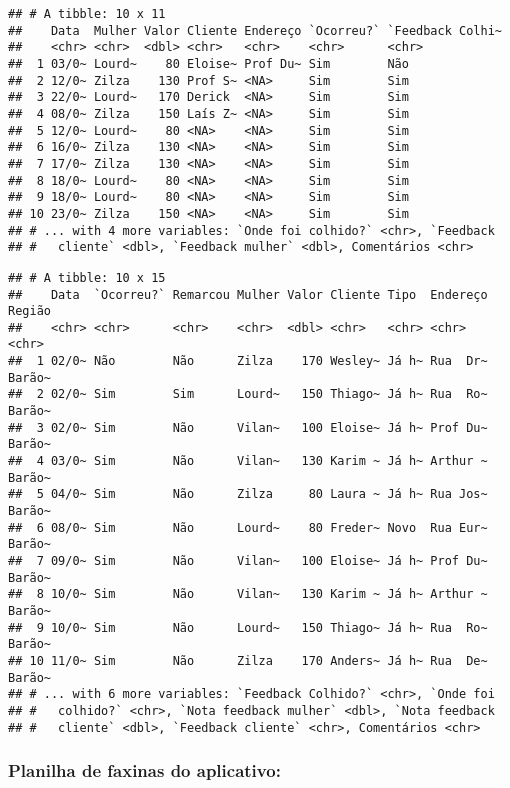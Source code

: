 \documentclass[
]{article}
\begin{document}
\begin{verbatim}
## # A tibble: 10 x 11
##    Data  Mulher Valor Cliente Endereço `Ocorreu?` `Feedback Colhi~
##    <chr> <chr>  <dbl> <chr>   <chr>    <chr>      <chr>           
##  1 03/0~ Lourd~    80 Eloise~ Prof Du~ Sim        Não             
##  2 12/0~ Zilza    130 Prof S~ <NA>     Sim        Sim             
##  3 22/0~ Lourd~   170 Derick  <NA>     Sim        Sim             
##  4 08/0~ Zilza    150 Laís Z~ <NA>     Sim        Sim             
##  5 12/0~ Lourd~    80 <NA>    <NA>     Sim        Sim             
##  6 16/0~ Zilza    130 <NA>    <NA>     Sim        Sim             
##  7 17/0~ Zilza    130 <NA>    <NA>     Sim        Sim             
##  8 18/0~ Lourd~    80 <NA>    <NA>     Sim        Sim             
##  9 18/0~ Lourd~    80 <NA>    <NA>     Sim        Sim             
## 10 23/0~ Zilza    150 <NA>    <NA>     Sim        Sim             
## # ... with 4 more variables: `Onde foi colhido?` <chr>, `Feedback
## #   cliente` <dbl>, `Feedback mulher` <dbl>, Comentários <chr>
\end{verbatim}

\begin{verbatim}
## # A tibble: 10 x 15
##    Data  `Ocorreu?` Remarcou Mulher Valor Cliente Tipo  Endereço Região
##    <chr> <chr>      <chr>    <chr>  <dbl> <chr>   <chr> <chr>    <chr> 
##  1 02/0~ Não        Não      Zilza    170 Wesley~ Já h~ Rua  Dr~ Barão~
##  2 02/0~ Sim        Sim      Lourd~   150 Thiago~ Já h~ Rua  Ro~ Barão~
##  3 02/0~ Sim        Não      Vilan~   100 Eloise~ Já h~ Prof Du~ Barão~
##  4 03/0~ Sim        Não      Vilan~   130 Karim ~ Já h~ Arthur ~ Barão~
##  5 04/0~ Sim        Não      Zilza     80 Laura ~ Já h~ Rua Jos~ Barão~
##  6 08/0~ Sim        Não      Lourd~    80 Freder~ Novo  Rua Eur~ Barão~
##  7 09/0~ Sim        Não      Vilan~   100 Eloise~ Já h~ Prof Du~ Barão~
##  8 10/0~ Sim        Não      Vilan~   130 Karim ~ Já h~ Arthur ~ Barão~
##  9 10/0~ Sim        Não      Lourd~   150 Thiago~ Já h~ Rua  Ro~ Barão~
## 10 11/0~ Sim        Não      Zilza    170 Anders~ Já h~ Rua  De~ Barão~
## # ... with 6 more variables: `Feedback Colhido?` <chr>, `Onde foi
## #   colhido?` <chr>, `Nota feedback mulher` <dbl>, `Nota feedback
## #   cliente` <dbl>, `Feedback cliente` <chr>, Comentários <chr>
\end{verbatim}

\hypertarget{planilha-de-faxinas-do-aplicativo}{%
\subsubsection{Planilha de faxinas do
aplicativo:}\label{planilha-de-faxinas-do-aplicativo}}
\end{document}
